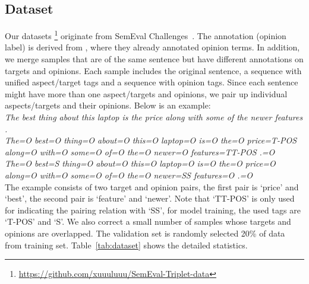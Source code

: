 \documentclass[letterpaper]{article} \usepackage{aaai20}  \usepackage{times}  \usepackage{helvet} \usepackage{courier}  \usepackage[hyphens]{url}  \usepackage{graphicx} \urlstyle{rm} \def\UrlFont{\rm}  \usepackage{graphicx}  \frenchspacing  \setlength{\pdfpagewidth}{8.5in}  \setlength{\pdfpageheight}{11in}
\begin{document}
\subsection{Dataset}
Our datasets \footnote{\url{https://github.com/xuuuluuu/SemEval-Triplet-data}} originate from SemEval Challenges~\cite{S14-2004,S15-2082,S16-1002}. The annotation (opinion label) is derived from \cite{fan2019target}, where they already annotated opinion terms. In addition, we merge samples that are of the same sentence but have different annotations on targets and opinions. Each sample includes the original sentence, a sequence with unified aspect/target tags and a sequence with opinion tags. Since each sentence might have more than one aspect/targets and opinions, we pair up individual aspects/targets and their opinions. Below is an example:\vspace{2mm}\\
\textit{
The best thing about this laptop is the price along with some of the newer features . \vspace{1mm}\\
The=O best=O thing=O about=O this=O laptop=O is=O the=O price=T-POS along=O with=O some=O of=O the=O newer=O features=TT-POS .=O \vspace{1mm}\\
The=O best=S thing=O about=O this=O laptop=O is=O the=O price=O along=O with=O some=O of=O the=O newer=SS features=O .=O\vspace{2mm}\\}
The example consists of two  target and opinion pairs, the first pair is `price' and `best', the second pair is `feature' and `newer'. Note that `TT-POS' is only used for indicating the pairing relation with `SS', for model training, the used tags are `T-POS' and `S'.
We also correct a small number of samples whose targets and opinions are overlapped. The validation set is randomly selected 20\% of data from training set. Table~\ref{tab:dataset} shows the detailed statistics.
\end{document}
